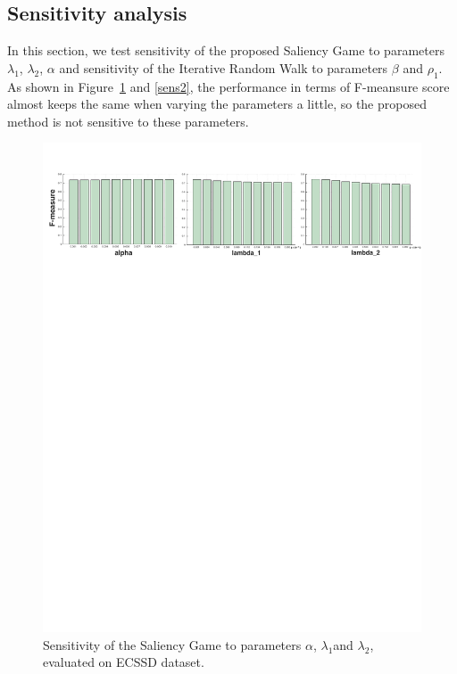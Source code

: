 \documentclass[journal]{IEEEtran}
\begin{document}
\subsection{Sensitivity analysis}
In this section, we test sensitivity of the proposed Saliency Game to parameters $\lambda_1$, $\lambda_2$, $\alpha$ and sensitivity of the Iterative Random Walk to parameters $\beta$ and $\rho_1$. As shown in Figure~\ref{sens1} and \ref{sens2}, the performance in terms of F-meansure score almost keeps the same when varying the parameters a little, so the proposed method is not sensitive to these parameters.
\begin{figure}[htbp]
\begin{center}
\includegraphics[width=1\linewidth]{sens.pdf}
\end{center}
\vspace{-10pt}
\caption{Sensitivity of the Saliency Game to parameters $\alpha$, $\lambda_1$and $\lambda_2$, evaluated on ECSSD dataset.}
\label{sens1}
\end{figure}
\end{document}
